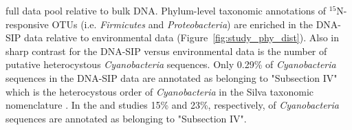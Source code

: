 full data pool relative to bulk DNA.  Phylum-level taxonomic annotations of
$^{15}$N-responsive OTUs (i.e. \textit{Firmicutes} and
\textit{Proteobacteria}) are enriched in the DNA-SIP data relative to
environmental data (Figure~\ref{fig:study_phy_dist}). Also in sharp contrast
for the DNA-SIP versus environmental data is the number of putative
heterocystous \textit{Cyanobacteria} sequences. Only 0.29\% of
\textit{Cyanobacteria} sequences in the DNA-SIP data are annotated as belonging
to "Subsection IV" which is the heterocystous order of \textit{Cyanobacteria}
in the Silva taxonomic nomenclature \citep{17947321}. In the
\citet{Steven_2013} and \citet{Garcia_Pichel_2013} studies 15\% and 23\%,
respectively, of \textit{Cyanobacteria} sequences are annotated as belonging to
"Subsection IV".  

